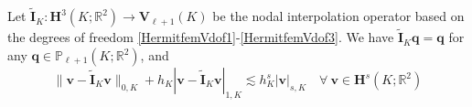 %
Let $\widetilde{\boldsymbol  I}_K: \boldsymbol{H}^3(K; \mathbb{R}^2)\to\boldsymbol V_{\ell+1}(K)$
be the nodal interpolation operator based on the degrees of freedom \eqref{HermitfemVdof1}-\eqref{HermitfemVdof3}.
We have $\widetilde{\boldsymbol  I}_K\boldsymbol  q=\boldsymbol  q$ for any $\boldsymbol  q\in\mathbb P_{\ell+1}(K;\mathbb R^2)$, and
\begin{equation}\label{eq:IKtildeestimate}
\|\boldsymbol  v-\widetilde{\boldsymbol  I}_K\boldsymbol  v\|_{0,K}+h_K|\boldsymbol  v-\widetilde{\boldsymbol  I}_K\boldsymbol  v|_{1,K} \lesssim h_K^{s}|\boldsymbol  v|_{s, K} \quad\forall~\boldsymbol  v\in \boldsymbol{H}^s(K; \mathbb{R}^2)
\end{equation}
